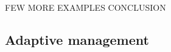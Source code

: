\documentclass[12pt,a4paper]{article}
\begin{document}

FEW MORE EXAMPLES
CONCLUSION

\subsection{Adaptive management}
\end{document}
